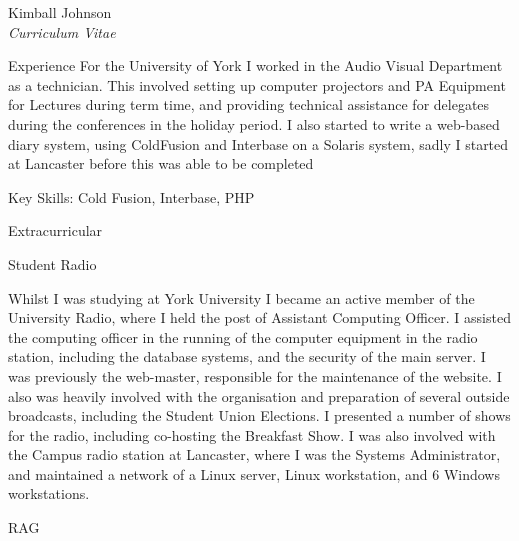 \documentclass[10pt]{article}
\begin{document}
\begin{cv}{Kimball Johnson\\{\large \itshape Curriculum Vitae}}
\begin{cvlist}{Experience}
    For the University of York I worked in the Audio Visual Department as a 
    technician. This involved setting up computer projectors and PA Equipment for 
    Lectures during term time, and providing technical assistance for delegates 
    during the conferences in the holiday period. I also started to write a 
    web-based diary system, using ColdFusion and Interbase on a Solaris
    system, sadly I started at Lancaster before this was able to be completed

 	Key Skills: Cold Fusion, Interbase, PHP



\end{cvlist}

\pagebreak
\begin{cvlist}{Extracurricular}
\item Student Radio

Whilst I was studying at York University I became an active member of the 
University Radio, where I held the post of Assistant Computing Officer. 
I assisted the computing officer in the running of the computer equipment
in the radio station, including the database systems, and the security of the 
main server. I was previously the web-master, responsible for the maintenance of
the website. I also was heavily involved with the organisation and preparation 
of several outside broadcasts, including the Student Union Elections. I 
presented a number of shows for the radio, including co-hosting the Breakfast 
Show.  I was also involved with the Campus radio station at Lancaster, where I 
was the Systems Administrator, and maintained a network of a Linux 
server, Linux workstation, and 6 Windows workstations.
\item RAG


\end{cvlist}
\end{cv}
\end{document}
